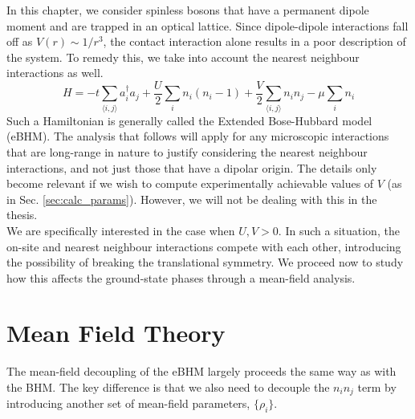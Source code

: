 In this chapter, we consider spinless bosons that have a permanent dipole moment and are trapped in an optical lattice. Since dipole-dipole interactions fall off as $V(r) \sim 1/r^3$, the contact interaction alone results in a poor description of the system. To remedy this, we take into account the nearest neighbour interactions as well.
\begin{equation}
    H = -t\sum_{\langle i, j\rangle} a_i^{\dagger}a_j + \frac{U}{2}\sum_i n_i(n_i - 1) + \frac{V}{2}\sum_{\langle i, j \rangle} n_i n_j - \mu \sum_i n_i
\end{equation}
Such a Hamiltonian is generally called the Extended Bose-Hubbard model (eBHM)\cite{Baier16}. The analysis that follows will apply for any microscopic interactions that are long-range in nature to justify considering the nearest neighbour interactions, and not just those that have a dipolar origin. The details only become relevant if we wish to compute experimentally achievable values of $V$\cite{Zhang_2021} (as in Sec. \ref{sec:calc_params}). However, we will not be dealing with this in the thesis.
\vspace{0.5cm}\\
We are specifically interested in the case when $U, V > 0$. In such a situation, the on-site and nearest neighbour interactions compete with each other, introducing the possibility of breaking the translational symmetry. We proceed now to study how this affects the ground-state phases through a mean-field analysis. 

\section{Mean Field Theory}
The mean-field decoupling of the eBHM largely proceeds the same way as with the BHM. The key difference is that we also need to decouple the $n_in_j$ term by introducing another set of mean-field parameters, $\{\rho_i\}$. 

